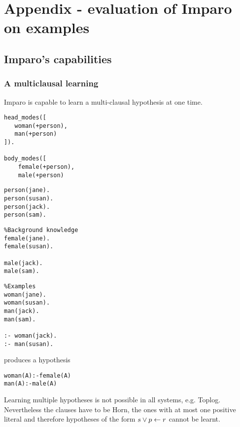 \chapter{Appendix - evaluation of Imparo on examples}\label{appendix_imparo}

\section{Imparo's capabilities}
\subsection{A multiclausal learning}
Imparo is capable to learn a multi-clausal hypothesis at one time.

\begin{minipage}[t]{.25\textwidth}
\begin{lstlisting}
head_modes([
   woman(+person),
   man(+person)
]).

body_modes([
    female(+person),
    male(+person)
\end{lstlisting}
\end{minipage}
\begin{minipage}[t]{.20\textwidth}
\begin{lstlisting}
person(jane).
person(susan).
person(jack).
person(sam).\end{lstlisting}
\end{minipage}
\begin{minipage}[t]{.30\textwidth}
\begin{lstlisting}
%Background knowledge
female(jane).
female(susan).

male(jack).
male(sam).
\end{lstlisting}
\end{minipage}
\begin{minipage}[t]{.25\textwidth}
\begin{lstlisting}
%Examples
woman(jane).
woman(susan).
man(jack).
man(sam).

:- woman(jack).
:- man(susan).
\end{lstlisting}
\end{minipage}


produces a hypothesis
\begin{lstlisting}
woman(A):-female(A)
man(A):-male(A)
\end{lstlisting}

Learning multiple hypotheses is not possible in all systems, e.g. Toplog. Nevertheless the clauses have to be Horn, the ones with at most one positive literal and therefore hypotheses of the form $s \vee p \leftarrow r$ cannot be learnt.

